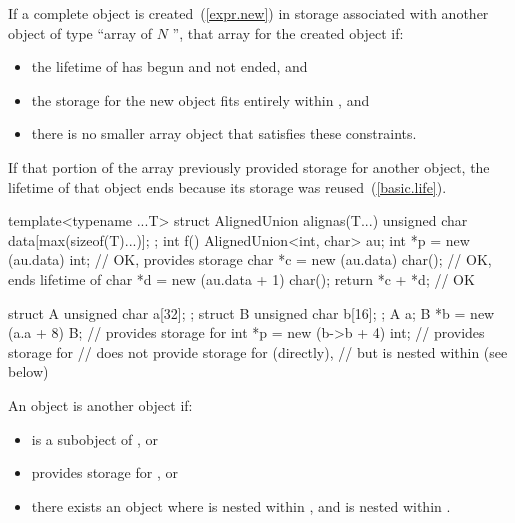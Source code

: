 \pnum
{}%
If a complete object is created~(\ref{expr.new})
in storage associated with another object 
of type ``array of $N$ '',
that array 
for the created object if:
\begin{itemize}
\item
the lifetime of  has begun and not ended, and
\item
the storage for the new object fits entirely within , and
\item
there is no smaller array object that satisfies these constraints.
\end{itemize}
\begin{note}
If that portion of the array
previously provided storage for another object,
the lifetime of that object ends
because its storage was reused~(\ref{basic.life}).
\end{note}
\begin{example}
\begin{codeblock}
template<typename ...T>
struct AlignedUnion {
  alignas(T...) unsigned char data[max(sizeof(T)...)];
};
int f() {
  AlignedUnion<int, char> au;
  int *p = new (au.data) int;     // OK,  provides storage
  char *c = new (au.data) char(); // OK, ends lifetime of 
  char *d = new (au.data + 1) char();
  return *c + *d; // OK
}

struct A { unsigned char a[32]; };
struct B { unsigned char b[16]; };
A a;
B *b = new (a.a + 8) B;      //  provides storage for 
int *p = new (b->b + 4) int; //  provides storage for 
                             //  does not provide storage for  (directly),
                             // but  is nested within  (see below)
\end{codeblock}
\end{example}

\pnum
{}%
An object  is  another object  if:
\begin{itemize}
\item
{} is a subobject of , or
\item
{} provides storage for , or
\item
there exists an object 
where  is nested within ,
and  is nested within .
\end{itemize}

